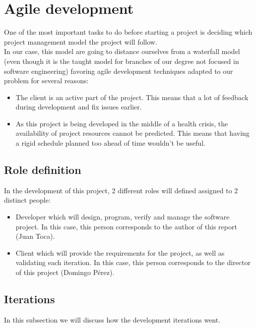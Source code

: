 \section{Agile development}

    One of the most important tasks to do before starting a project is deciding
    which project management model the project will follow.\\

    In our case, this model are going to distance ourselves from a waterfall model
    (even though it is the taught model for branches of our degree not focused
    in software engineering) favoring agile development techniques adapted to
    our problem for several reasons:
    \begin{itemize}
      \item The client is an active part of the project. This means that
      a lot of feedback during development and fix issues earlier.
      \item As this project is being developed in the middle of a health crisis,
      the availability of project resources cannot be predicted. This means
      that having a rigid schedule planned too ahead of time wouldn't be
      useful.
    \end{itemize}

    \subsection{Role definition}

    In the development of this project, 2 different roles will defined
    assigned to 2 distinct people:
    \begin{itemize}
      \item Developer which will design, program, verify and manage the
      software project. In this case, this person corresponds to the author of
      this report (Juan Toca).
      \item Client which will provide the requirements for the project, as well
      as validating each iteration. In this case, this person corresponds to
      the director of this project (Domingo Pérez).
    \end{itemize}

    \subsection{Iterations}

      In this subsection we will discuss how the development iterations went.\\

